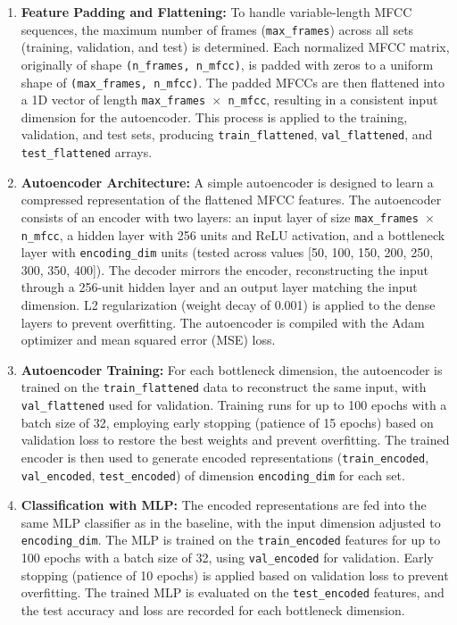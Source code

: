 \documentclass[12pt]{article}
\begin{document}
\begin{enumerate}
    \item \textbf{Feature Padding and Flattening:}
   To handle variable-length MFCC sequences, the maximum number of frames (\texttt{max\_frames}) across all sets (training, validation, and test) is determined. Each normalized MFCC matrix, originally of shape \texttt{(n\_frames, n\_mfcc)}, is padded with zeros to a uniform shape of \texttt{(max\_frames, n\_mfcc)}. The padded MFCCs are then flattened into a 1D vector of length \texttt{max\_frames $\times$ n\_mfcc}, resulting in a consistent input dimension for the autoencoder. This process is applied to the training, validation, and test sets, producing \texttt{train\_flattened}, \texttt{val\_flattened}, and \texttt{test\_flattened} arrays.

   \item \textbf{Autoencoder Architecture:}
   A simple autoencoder is designed to learn a compressed representation of the flattened MFCC features. The autoencoder consists of an encoder with two layers: an input layer of size \texttt{max\_frames $\times$ n\_mfcc}, a hidden layer with 256 units and ReLU activation, and a bottleneck layer with \texttt{encoding\_dim} units (tested across values [50, 100, 150, 200, 250, 300, 350, 400]). The decoder mirrors the encoder, reconstructing the input through a 256-unit hidden layer and an output layer matching the input dimension. L2 regularization (weight decay of 0.001) is applied to the dense layers to prevent overfitting. The autoencoder is compiled with the Adam optimizer and mean squared error (MSE) loss.

   \item \textbf{Autoencoder Training:}
   For each bottleneck dimension, the autoencoder is trained on the \texttt{train\_flattened} data to reconstruct the same input, with \texttt{val\_flattened} used for validation. Training runs for up to 100 epochs with a batch size of 32, employing early stopping (patience of 15 epochs) based on validation loss to restore the best weights and prevent overfitting. The trained encoder is then used to generate encoded representations (\texttt{train\_encoded}, \texttt{val\_encoded}, \texttt{test\_encoded}) of dimension \texttt{encoding\_dim} for each set.

   \item \textbf{Classification with MLP:}
   The encoded representations are fed into the same MLP classifier as in the baseline, with the input dimension adjusted to \texttt{encoding\_dim}. The MLP is trained on the \texttt{train\_encoded} features for up to 100 epochs with a batch size of 32, using \texttt{val\_encoded} for validation. Early stopping (patience of 10 epochs) is applied based on validation loss to prevent overfitting. The trained MLP is evaluated on the \texttt{test\_encoded} features, and the test accuracy and loss are recorded for each bottleneck dimension.


\end{enumerate}
\end{document}
